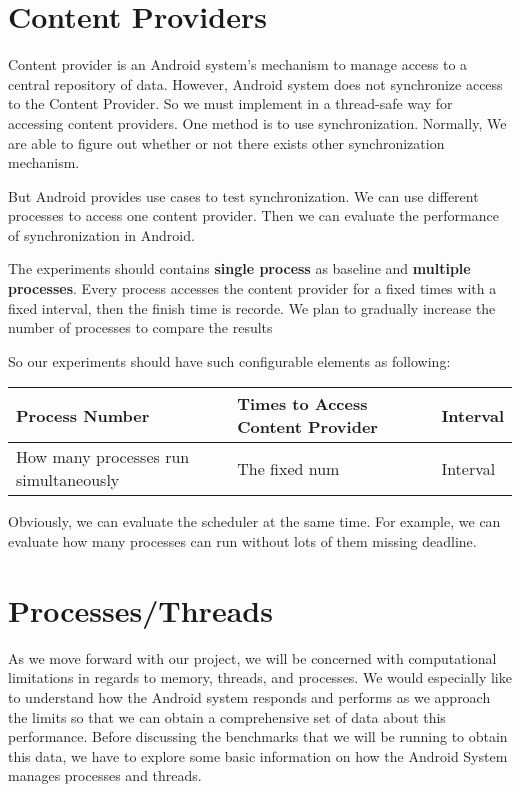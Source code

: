 \documentclass[11pt]{article}
\begin{document}
\section{Content Providers}
\label{sec-4}
Content provider is an Android system's mechanism to manage access to a central repository of data.
However, Android system does not synchronize access to the Content Provider.
So we must implement in a thread-safe way for accessing content providers.
One method is to use synchronization. Normally, We are able to figure out whether or not there exists other synchronization mechanism.

But Android provides use cases to test synchronization. We can use different processes to access one content provider.
Then we can evaluate the performance of synchronization in Android.

The experiments should contains \textbf{single process} as baseline and \textbf{multiple processes}.
Every process accesses the content provider for a fixed times with a fixed interval, then the finish time is recorde.
We plan to gradually increase the number of processes to compare the results

So our experiments should have such configurable elements as following:

\begin{center}
\begin{tabular}{l|l|l}
Process Number & Times to Access Content Provider & Interval\\
\hline
How many processes run simultaneously & The fixed num & Interval\\
\end{tabular}
\end{center}

Obviously, we can evaluate the scheduler  at the same time.
For example, we can evaluate how many processes can run without lots of them missing deadline.

\section{\label{Processes/Threads}Processes/Threads}
\label{sec-5}
As we move forward with our project, we will be concerned with computational limitations in regards to memory, threads, and processes.  We would especially like to understand how the Android system responds and performs as we approach the limits so that we can obtain a comprehensive set of data about this performance.  Before discussing the benchmarks that we will be running to obtain this data, we have to explore some basic information on how the Android System manages processes and threads.
\end{document}
